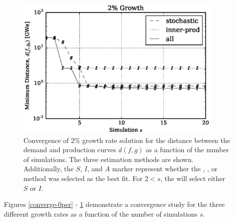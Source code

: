 \begin{figure}[htb]
\centering
\includegraphics[width=0.9\textwidth]{converge-2per.eps}
\caption{Convergence of 2\% growth rate solution for the distance between
the demand and production curves $d(f, g)$ as a function of the number of 
simulations. The three estimation methods are shown. Additionally, the
$S$, $I$, and $A$ marker represent whether the \stochastic, \innerprod, 
or \allflag method was selected as the best fit. For $2 < s$, the \allflag
will select either $S$ or $I$.
}
\label{converge-2per}
\end{figure}

Figures \ref{converge-0per} - \ref{converge-2per} demonstrate a convergence 
study for the three 
different growth rates as a function of the number of simulations $s$.
